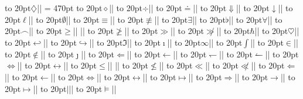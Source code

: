 \ord\hbox to 20pt{$\diamondsuit$\quad\hss}\@|\diamondsuit|
\balancecolumnsize = 470pt
\bin\hbox to 20pt{$\diamond$\quad\hss}\@|\diamond|
\bin\hbox to 20pt{$\div$\quad\hss}\@|\div|
\rel\hbox to 20pt{$\doteq$\quad\hss}\@|\doteq|
\rel\hbox to 20pt{$\Downarrow$\quad\hss}\@|\Downarrow|
\rel\hbox to 20pt{$\downarrow$\quad\hss}\@|\downarrow| 
\ord\hbox to 20pt{$\ell$\quad\hss}\@|\ell|
\ord\hbox to 20pt{$\emptyset$\quad\hss}\@|\emptyset|
\rel\hbox to 20pt{$\equiv$\quad\hss}\@|\equiv|
\rel\hbox to 20pt{$\not\equiv$\quad\hss}\@|\not\equiv|
\ord\hbox to 20pt{$\exists$\quad\hss}\@|\exists|
\ord\hbox to 20pt{$\flat$\quad\hss}\@|\flat|
\ord\hbox to 20pt{$\forall$\quad\hss}\@|\forall|
\ord\hbox to 20pt{$\frown$\quad\hss}\@|\frown|
\rel\hbox to 20pt{$\geq$\quad\hss}\@|\ge| \@|\geq|
\rel\hbox to 20pt{$\not\geq$\quad\hss}\@|\not\geq|
\rel\hbox to 20pt{$\gg$\quad\hss}\@|\gg|
\rel\hbox to 20pt{$\not\gg$\quad\hss}\@|\not\gg|
\ord\hbox to 20pt{$\hbar$\quad\hss}\@|\hbar|
\ord\hbox to 20pt{$\heartsuit$\quad\hss}\@|\heartsuit|
\rel\hbox to 20pt{$\hookleftarrow$\quad\hss}\@|\hookleftarrow| 
\rel\hbox to 20pt{$\hookrightarrow$\quad\hss}\@|\hookrightarrow|
\ord\hbox to 20pt{$\Im$\quad\hss}\@|\Im|
\ord\hbox to 20pt{$\imath$\quad\hss}\@|\imath|
\ord\hbox to 20pt{$\infty$\quad\hss}\@|\infty|
\op\hbox to 20pt{$\int$\quad\hss}\@|\int|
\rel\hbox to 20pt{$\in$\quad\hss}\@|\in|
\rel\hbox to 20pt{$\not\in$\quad\hss}\@|\not\in|
\ord\hbox to 20pt{$\jmath$\quad\hss}\@|\jmath|
\rel\hbox to 20pt{$\Leftarrow$\quad\hss}\@|\Leftarrow|
\rel\hbox to 20pt{$\leftarrow$\quad\hss}\@|\leftarrow| 
\rel\hbox to 20pt{$\leftharpoondown$\quad\hss}\@|\leftharpoondown| 
\rel\hbox to 20pt{$\leftharpoonup$\quad\hss}\@|\leftharpoonup| 
\rel\hbox to 20pt{$\Leftrightarrow$\quad\hss}\@|\Leftrightarrow| 
\rel\hbox to 20pt{$\leftrightarrow$\quad\hss}\@|\leftrightarrow| 
\rel\hbox to 20pt{$\leq$\quad\hss}\@|\le| \@|\leq|
\rel\hbox to 20pt{$\not\leq$\quad\hss}\@|\not\leq|
\rel\hbox to 20pt{$\ll$\quad\hss}\@|\ll|
\rel\hbox to 20pt{$\not\ll$\quad\hss}\@|\not\ll|
\rel\hbox to 20pt{$\Longleftarrow$\quad\hss}\@|\Longleftarrow| 
\rel\hbox to 20pt{$\longleftarrow$\quad\hss}\@|\longleftarrow| 
\rel\hbox to 20pt{$\Longleftrightarrow$\quad\hss}\@|\Longleftrightarrow| 
\rel\hbox to 20pt{$\longleftrightarrow$\quad\hss}\@|\longleftrightarrow|  
\rel\hbox to 20pt{$\longmapsto$\quad\hss}\@|\longmapsto| 
\rel\hbox to 20pt{$\Longrightarrow$\quad\hss}\@|\Longrightarrow| 
\rel\hbox to 20pt{$\longrightarrow$\quad\hss}\@|\longrightarrow|
\rel\hbox to 20pt{$\mapsto$\quad\hss}\@|\mapsto|
\rel\hbox to 20pt{$\mid$\quad\hss}\@|\mid|
\rel\hbox to 20pt{$\models$\quad\hss}\@|\models|
